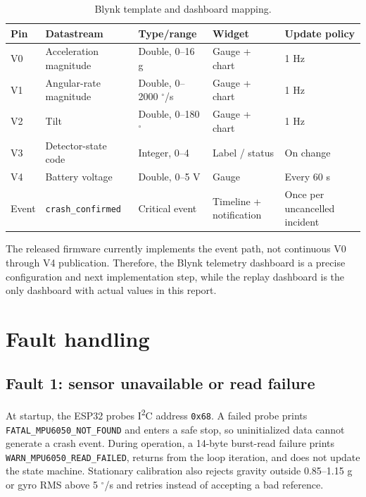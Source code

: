 \documentclass[12pt,a4paper]{article}
\newcommand{\degree}{\ensuremath{^{\circ}}}
\begin{document}
\begin{table}[H]
\centering
\small
\caption{Blynk template and dashboard mapping.}
\label{tab:blynkmap}
\begin{tabularx}{\textwidth}{@{}p{}p{}p{}p{}X@{}}
\toprule
Pin & Datastream & Type/range & Widget & Update policy \\
\midrule
V0 & Acceleration magnitude & Double, 0--16 g & Gauge + chart & 1 Hz \\
V1 & Angular-rate magnitude & Double, 0--2000 $\degree$/s & Gauge + chart & 1 Hz \\
V2 & Tilt & Double, 0--180 $\degree$ & Gauge + chart & 1 Hz \\
V3 & Detector-state code & Integer, 0--4 & Label / status & On change \\
V4 & Battery voltage & Double, 0--5 V & Gauge & Every 60 s \\
Event & \texttt{crash\_confirmed} & Critical event & Timeline + notification & Once per uncancelled incident \\
\bottomrule
\end{tabularx}
\end{table}

The released firmware currently implements the event path, not continuous V0
through V4 publication. Therefore, the Blynk telemetry dashboard is a precise
configuration and next implementation step, while the replay dashboard is the
only dashboard with actual values in this report.

\section{Fault handling}
\label{sec:faults}

\subsection{Fault 1: sensor unavailable or read failure}

At startup, the ESP32 probes I\textsuperscript{2}C address \texttt{0x68}. A
failed probe prints \texttt{FATAL\_MPU6050\_\allowbreak NOT\_FOUND} and enters a safe stop,
so uninitialized data cannot generate a crash event. During operation, a
14-byte burst-read failure prints \texttt{WARN\_MPU6050\_\allowbreak READ\_FAILED}, returns
from the loop iteration, and does not update the state machine. Stationary
calibration also rejects gravity outside 0.85--1.15 g or gyro RMS above
5 $\degree$/s and retries instead of accepting a bad reference.
\end{document}
